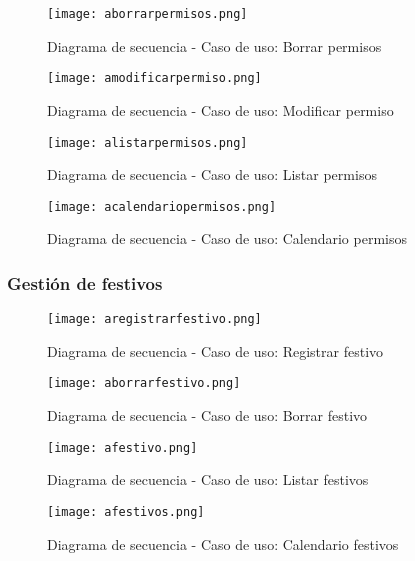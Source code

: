 \begin{figure}[!htb]
  \centering
    \texttt{[image: aborrarpermisos.png]}
  \caption{Diagrama de secuencia - Caso de uso: Borrar permisos }
  \label{a}
\end{figure}

\begin{figure}[!htb]
  \centering
    \texttt{[image: amodificarpermiso.png]}
  \caption{Diagrama de secuencia - Caso de uso: Modificar permiso }
  \label{a}
\end{figure}

\begin{figure}[!htb]
  \centering
    \texttt{[image: alistarpermisos.png]}
  \caption{Diagrama de secuencia - Caso de uso: Listar permisos }
  \label{a}
\end{figure}

\clearpage

\begin{figure}[!htb]
  \centering
    \texttt{[image: acalendariopermisos.png]}
  \caption{Diagrama de secuencia - Caso de uso: Calendario permisos }
  \label{a}
\end{figure}

\subsubsection{Gestión de festivos}
\begin{figure}[!htb]
  \centering
    \texttt{[image: aregistrarfestivo.png]}
  \caption{Diagrama de secuencia - Caso de uso: Registrar festivo }
  \label{a}
\end{figure}

\begin{figure}[!htb]
  \centering
    \texttt{[image: aborrarfestivo.png]}
  \caption{Diagrama de secuencia - Caso de uso: Borrar festivo }
  \label{a}
\end{figure}

\begin{figure}[!htb]
  \centering
    \texttt{[image: afestivo.png]}
  \caption{Diagrama de secuencia - Caso de uso: Listar festivos }
  \label{a}
\end{figure}

\begin{figure}[!htb]
  \centering
    \texttt{[image: afestivos.png]}
  \caption{Diagrama de secuencia - Caso de uso: Calendario festivos }
  \label{a}
\end{figure}
\clearpage

